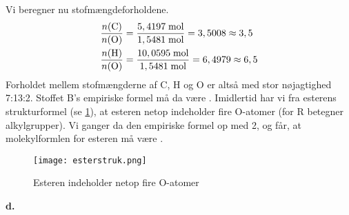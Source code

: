 \documentclass{report}
\begin{document}
Vi beregner nu stofmængdeforholdene.
\begin{equation*}
\begin{split}
  \frac{n(\ce{C} )}{n(\ce{O} )}&=\frac{5,4197 \;\unit{mol} }{1,5481 \;\unit{mol} }= 3,5008 \approx 3,5 \\
  \frac{n(\ce{H} )}{n(\ce{O} )}&=\frac{10,0595 \;\unit{mol} }{1,5481 \;\unit{mol} }=6,4979 \approx 6,5
\end{split}
\end{equation*}
Forholdet mellem stofmængderne af C, H og O er altså med stor nøjagtighed 7:13:2.
Stoffet B's empiriske formel må da være .
Imidlertid har vi fra esterens strukturformel (se \cref{fig:esterstruk}), at esteren netop indeholder fire O-atomer (for R betegner alkylgrupper).
Vi ganger da den empiriske formel op med 2, og får, at molekylformlen for esteren må være .
\begin{figure}[H]
\begin{center}
  \texttt{[image: esterstruk.png]}
\end{center}
\caption{Esteren indeholder netop fire O-atomer}
\label{fig:esterstruk}
\end{figure}
\noindent \textbf{d.}
\end{document}
